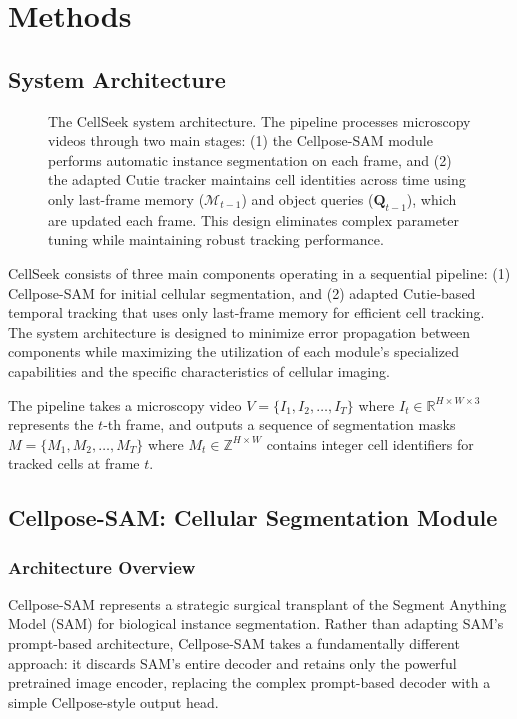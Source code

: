 \documentclass[../cellseek_paper.tex]{subfiles}
\begin{document}
\section{Methods}

\subsection{System Architecture}

\begin{figure}[H]
  \centering
  
  \caption{The CellSeek system architecture. The pipeline processes microscopy videos through two main stages: (1) the Cellpose-SAM module performs automatic instance segmentation on each frame, and (2) the adapted Cutie tracker maintains cell identities across time using only last-frame memory ($\mathcal{M}_{t-1}$) and object queries ($\mathbf{Q}_{t-1}$), which are updated each frame. This design eliminates complex parameter tuning while maintaining robust tracking performance.}
  \label{fig:architecture}
\end{figure}

CellSeek consists of three main components operating in a sequential pipeline: (1) Cellpose-SAM for initial cellular segmentation, and (2) adapted Cutie-based temporal tracking that uses only last-frame memory for efficient cell tracking. The system architecture is designed to minimize error propagation between components while maximizing the utilization of each module's specialized capabilities and the specific characteristics of cellular imaging.

The pipeline takes a microscopy video $V = \{I_1, I_2, \ldots, I_T\}$ where $I_t \in \mathbb{R}^{H \times W \times 3}$ represents the $t$-th frame, and outputs a sequence of segmentation masks $M = \{M_1, M_2, \ldots, M_T\}$ where $M_t \in \mathbb{Z}^{H \times W}$ contains integer cell identifiers for tracked cells at frame $t$.

\subsection{Cellpose-SAM: Cellular Segmentation Module}

\subsubsection{Architecture Overview}

Cellpose-SAM represents a strategic surgical transplant of the Segment Anything Model (SAM) for biological instance segmentation. Rather than adapting SAM's prompt-based architecture, Cellpose-SAM takes a fundamentally different approach: it discards SAM's entire decoder and retains only the powerful pretrained image encoder, replacing the complex prompt-based decoder with a simple Cellpose-style output head.
\end{document}
